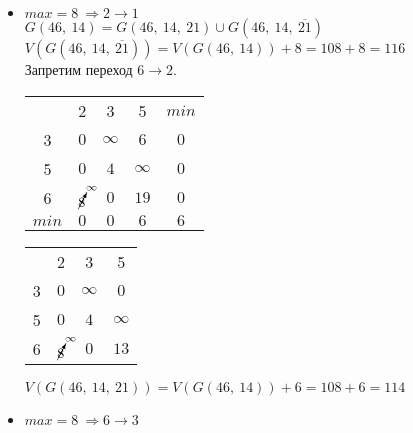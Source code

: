 \begin{itemize}
	\item $max = 8\ \Rightarrow 2 \rightarrow 1$\\
	
	$G(46,\ 14) = G(46,\ 14,\ 21) \cup G(46,\ 14,\ \overline{21})$\\
	$V(G(46,\ 14,\ \overline{21})) = V(G(46,\ 14)) + 8 = 108 + 8 = 116$\\
	Запретим переход $6 \rightarrow 2$.

	\begin{table}[H]
	\begin{center}
		\def\tabcolsep{18pt}
		\def\arraystretch{1.5}
		\fontsize{13}{14}\selectfont
		\begin{tabular}{|c||c|c|c||c|}
			\hline 
	  		& 2 & 3 & 5 & $min$\\ 
			\hhline{|=#=|=|=#=|} 
			3 & $0$ & $\infty$ & $6$ & $0$ \\ 
			\hline 
			5 & $0$ & $4$ & $\infty$ & $0$ \\ 
			\hline 
			6 & $\cancelto{\infty}{8}$ & $0$ & $19$ & $0$ \\
			\hhline{|=#=|=|=#=|}
			$min$ & $0$ & $0$ & $6$ & $6$ \\
			\hline
		\end{tabular}  
	\end{center}
	\end{table}

	\begin{table}[H]
	\begin{center}
		\def\tabcolsep{18pt}
		\def\arraystretch{1.5}
		\fontsize{13}{14}\selectfont
		\begin{tabular}{|c||c|c|c|}
			\hline 
	  		& 2 & 3 & 5 \\ 
			\hhline{|=#=|=|=|} 
			3 & $0$ & $\infty$ & $0$ \\ 
			\hline 
			5 & $0$ & $4$ & $\infty$ \\ 
			\hline 
			6 & $\cancelto{\infty}{8}$ & $0$ & $13$ \\
			\hline
		\end{tabular}  
	\end{center}
	\end{table}

	$V(G(46,\ 14,\ 21)) = V(G(46,\ 14)) + 6 = 108 + 6 = 114$\\
	
	
	\item $max = 8\ \Rightarrow 6 \rightarrow 3$\\
	

\end{itemize}
